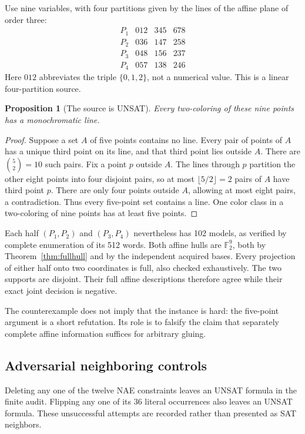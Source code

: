 \documentclass[11pt,letterpaper]{article}
\newtheorem{proposition}[theorem]{Proposition}
\theoremstyle{definition}
\newcommand{\F}{\mathbb F_2}
\begin{document}
Use nine variables, with four partitions given by the lines of the affine plane of order three:
\[
\begin{array}{c|ccc}
P_1&012&345&678\\
P_2&036&147&258\\
P_3&048&156&237\\
P_4&057&138&246
\end{array}
\]
Here $012$ abbreviates the triple $\{0,1,2\}$, not a numerical value. This is a linear four-partition source.

\begin{proposition}[The source is UNSAT]
Every two-coloring of these nine points has a monochromatic line.
\end{proposition}
\begin{proof}
Suppose a set $A$ of five points contains no line. Every pair of points of $A$ has a unique third point on its line, and that third point lies outside $A$. There are $\binom52=10$ such pairs. Fix a point $p$ outside $A$. The lines through $p$ partition the other eight points into four disjoint pairs, so at most $\lfloor5/2\rfloor=2$ pairs of $A$ have third point $p$. There are only four points outside $A$, allowing at most eight pairs, a contradiction. Thus every five-point set contains a line. One color class in a two-coloring of nine points has at least five points.
\end{proof}

Each half $(P_1,P_2)$ and $(P_3,P_4)$ nevertheless has 102 models, as verified by complete enumeration of its 512 words. Both affine hulls are $\F^9$, both by Theorem~\ref{thm:fullhull} and by the independent acquired bases. Every projection of either half onto two coordinates is full, also checked exhaustively. The two supports are disjoint. Their full affine descriptions therefore agree while their exact joint decision is negative.

The counterexample does not imply that the instance is hard: the five-point argument is a short refutation. Its role is to falsify the claim that separately complete affine information suffices for arbitrary gluing.

\subsection{Adversarial neighboring controls}

Deleting any one of the twelve NAE constraints leaves an UNSAT formula in the finite audit. Flipping any one of its 36 literal occurrences also leaves an UNSAT formula. These unsuccessful attempts are recorded rather than presented as SAT neighbors.
\end{document}
